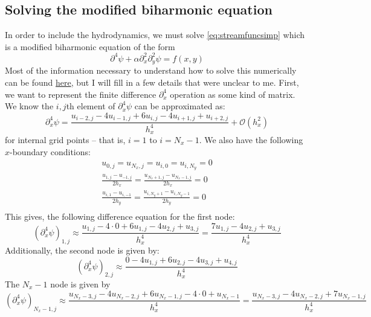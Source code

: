\documentclass[reqno]{article}
\begin{document}
	\subsection{Solving the modified biharmonic equation}
	In order to include the hydrodynamics, we must solve \eqref{eq:streamfuncsimp} which is a modified biharmonic equation of the form
	\begin{equation}
		\partial^4 \psi + \alpha \partial_x^2\partial_y^2 \psi = f(x, y)
	\end{equation}
	Most of the information necessary to understand how to solve this numerically can be found \href{https://math.stackexchange.com/a/3763462/683123}{here}, but I will fill in a few details that were unclear to me. First, we want to represent the finite difference $\partial_x^4$ operation as some kind of matrix. We know the $i, j$th element of $\partial_x^4 \psi$ can be approximated as:
	\begin{equation}
		\partial_x^4 \psi = \frac{u_{i-2,j} -4 u_{i-1,j} + 6u_{i,j} -4 u_{i+1,j} + u_{i+2,j}}{h_x^4} + \mathcal{O}(h_x^2)
	\end{equation}
	for internal grid points -- that is, $i = 1$ to $i = N_x - 1$. We also have the following $x$-boundary conditions:
	\begin{align}
		u_{0,j} = u_{N_x,j} = u_{i,0} = u_{i,N_y} = 0\\
		\frac{u_{1,j} - u_{-1,j}}{2h_x} = 
		\frac{u_{N_x + 1,j} - u_{N_x - 1,j}}{2h_x} = 0\\
		\frac{u_{i,1} - u_{i,-1}}{2h_y} = 
		\frac{u_{i,N_y+1} - u_{i,N_y-1}}{2h_y} = 0\\
	\end{align}
	This gives, the following difference equation for the first node:
	\begin{equation}
		(\partial_x^4 \psi)_{1, j} \approx \frac{u_{1, j} - 4\cdot0 + 6u_{1, j} - 4u_{2, j} + u_{3, j}}{h_x^4} = \frac{7u_{1, j} - 4u_{2, j} + u_{3, j}}{h_x^4}
	\end{equation}
	Additionally, the second node is given by:
	\begin{equation}
		(\partial_x^4 \psi)_{2, j} \approx \frac{0 - 4u_{1, j} + 6u_{2, j} - 4u_{3, j} + u_{4, j}}{h_x^4}
	\end{equation}
	The $N_x - 1$ node is given by
	\begin{equation}
		(\partial_x^4 \psi)_{N_x - 1, j} \approx \frac{u_{N_x - 3, j} - 4u_{N_x - 2, j} + 6u_{N_x - 1, j} - 4\cdot0 + u_{N_x - 1}}{h_x^4} = \frac{u_{N_x - 3, j} - 4u_{N_x - 2, j} + 7u_{N_x - 1, j}}{h_x^4}
	\end{equation}
\end{document}
